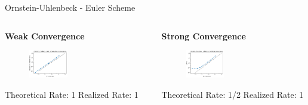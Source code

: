 \documentclass[]{beamer}
\begin{document}
\begin{frame}{Ornstein-Uhlenbeck - Euler Scheme}
  \begin{columns}
    \begin{column}{0.475\textwidth}
    \begin{center}
      \textbf{Weak Convergence}
    \end{center}
    \begin{figure}[t]
    \vspace{-1pt}
    \captionsetup[figure]{labelformat=empty}
    \includegraphics[width=0.4\textwidth]{ou_weak_euler.png}
    \end{figure}
    Theoretical Rate: 1
    \newline
    Realized Rate: 1
    \end{column}

    \begin{column}{0.475\textwidth}
    \begin{center}
      \textbf{Strong Convergence}
    \end{center}
    \begin{figure}[t]
    \vspace{-1pt}
    \captionsetup[figure]{labelformat=empty}
    \includegraphics[width=0.4\textwidth]{ou_strong_euler.png}
    \end{figure}
    Theoretical Rate: 1/2
    \newline
    Realized Rate: 1
    \end{column}
  \end{columns}
\end{frame}
\end{document}
